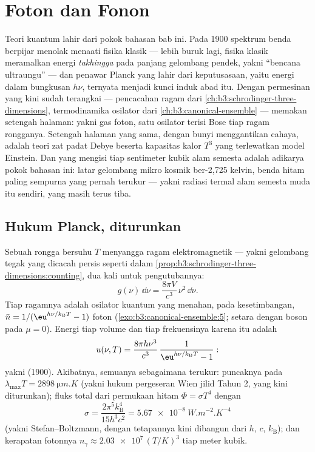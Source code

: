 \chapter{Foton dan Fonon}\label{ch:b3:photons-phonons}

Teori kuantum lahir dari pokok bahasan bab ini. Pada 1900 spektrum
benda berpijar menolak menaati fisika klasik --- lebih buruk lagi,
fisika klasik meramalkan energi \emph{takhingga} pada panjang gelombang
pendek, yakni ``bencana ultraungu'' --- dan penawar Planck yang lahir
dari keputusasaan, yaitu energi dalam bungkusan $h\nu$, ternyata menjadi
kunci induk abad itu. Dengan permesinan yang kini sudah terangkai ---
pencacahan ragam dari \cref{ch:b3:schrodinger-three-dimensions},
termodinamika osilator dari \cref{ch:b3:canonical-ensemble} ---  memakan setengah halaman: yakni gas foton, satu osilator
terisi Bose tiap ragam rongganya. Setengah halaman yang sama, dengan
bunyi menggantikan cahaya, adalah teori zat padat Debye beserta
kapasitas kalor $T^3$ yang terlewatkan model Einstein. Dan yang mengisi
tiap sentimeter kubik alam semesta adalah adikarya pokok bahasan ini:
latar gelombang mikro kosmik ber-2,725 kelvin, benda hitam paling
sempurna yang pernah terukur --- yakni radiasi termal alam semesta muda
itu sendiri, yang masih terus tiba.

\section{Hukum Planck, diturunkan}

\begin{theorem}\label{thm:b3:photons-phonons:planck}
Sebuah rongga bersuhu $T$ menyangga ragam elektromagnetik ---
yakni gelombang tegak yang dicacah persis seperti dalam
\cref{prop:b3:schrodinger-three-dimensions:counting}, dua kali untuk
pengutubannya:
\[
g(\nu)\,\dd\nu = \frac{8\pi V}{c^3}\,\nu^2\,\dd\nu .
\]
Tiap ragamnya adalah osilator kuantum yang menahan, pada kesetimbangan,
$\bar n = 1/(\eu^{h\nu/k_{\text{B}}T} - 1)$ foton
(\cref{exo:b3:canonical-ensemble:5}; setara dengan boson pada $\mu =
0$). Energi tiap volume dan tiap frekuensinya karena itu adalah
\[
u(\nu, T) = \frac{8\pi h\nu^3}{c^3}\,
\frac{1}{\eu^{h\nu/k_{\text{B}}T} - 1} :
\]
yakni \emph{} (1900). Akibatnya, semuanya sebagaimana terukur:
puncaknya pada $\lambda_{\max}T = \qty{2898}{\micro m.K}$ (yakni hukum
pergeseran Wien jilid Tahun 2, yang kini diturunkan); fluks total
dari permukaan hitam $\Phi = \sigma T^4$ dengan
\[
\sigma = \frac{2\pi^5k_{\text{B}}^4}{15h^3c^2}
 = \qty{5.67e-8}{W.m^{-2}.K^{-4}}
\]
(yakni Stefan--Boltzmann, dengan tetapannya kini dibangun dari $h$, $c$,
$k_{\text{B}}$); dan kerapatan fotonnya $n_\gamma \approx
\num{2.03e7}\,(T/\unit{K})^3$ tiap meter kubik.
\end{theorem}

